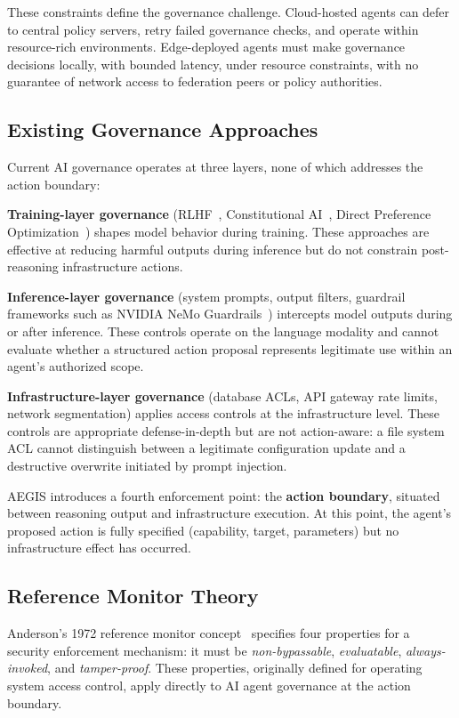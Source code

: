 \documentclass[journal]{IEEEtran}
\begin{document}
These constraints define the governance challenge. Cloud-hosted agents can defer to central policy servers, retry failed governance checks, and operate within resource-rich environments. Edge-deployed agents must make governance decisions locally, with bounded latency, under resource constraints, with no guarantee of network access to federation peers or policy authorities.

\subsection{Existing Governance Approaches}

Current AI governance operates at three layers, none of which addresses the action boundary:

\textbf{Training-layer governance} (RLHF~\cite{christiano2017}, Constitutional AI~\cite{bai2022}, Direct Preference Optimization~\cite{rafailov2023}) shapes model behavior during training. These approaches are effective at reducing harmful outputs during inference but do not constrain post-reasoning infrastructure actions.

\textbf{Inference-layer governance} (system prompts, output filters, guardrail frameworks such as NVIDIA NeMo Guardrails~\cite{nemo_guardrails}) intercepts model outputs during or after inference. These controls operate on the language modality and cannot evaluate whether a structured action proposal represents legitimate use within an agent's authorized scope.

\textbf{Infrastructure-layer governance} (database ACLs, API gateway rate limits, network segmentation) applies access controls at the infrastructure level. These controls are appropriate defense-in-depth but are not action-aware: a file system ACL cannot distinguish between a legitimate configuration update and a destructive overwrite initiated by prompt injection.

AEGIS introduces a fourth enforcement point: the \textbf{action boundary}, situated between reasoning output and infrastructure execution. At this point, the agent's proposed action is fully specified (capability, target, parameters) but no infrastructure effect has occurred.

\subsection{Reference Monitor Theory}

Anderson's 1972 reference monitor concept~\cite{anderson1972} specifies four properties for a security enforcement mechanism: it must be \textit{non-bypassable}, \textit{evaluatable}, \textit{always-invoked}, and \textit{tamper-proof}. These properties, originally defined for operating system access control, apply directly to AI agent governance at the action boundary.
\end{document}
